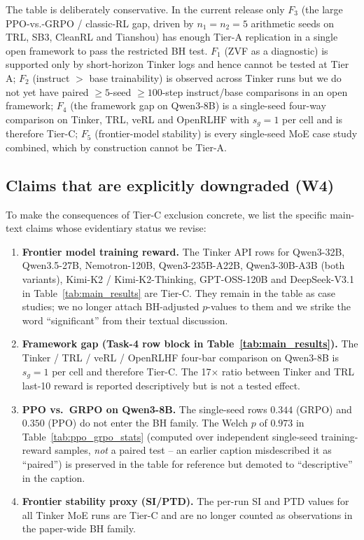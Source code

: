The table is deliberately conservative. In the current release only
$F_3$ (the large PPO-vs.-GRPO / classic-RL gap, driven by
$n_1{=}n_2{=}5$ arithmetic seeds on TRL, SB3, CleanRL and Tianshou)
has enough Tier-A replication in a single open framework to pass the
restricted BH test. $F_1$ (ZVF as a diagnostic) is supported only by
short-horizon Tinker logs and hence cannot be tested at Tier A;
$F_2$ (instruct $>$ base trainability) is observed across Tinker
runs but we do not yet have paired $\ge 5$-seed $\ge 100$-step
instruct/base comparisons in an open framework; $F_4$ (the framework
gap on Qwen3-8B) is a single-seed four-way comparison on Tinker,
TRL, veRL and OpenRLHF with $s_g{=}1$ per cell and is therefore
Tier-C; $F_5$ (frontier-model stability) is every single-seed MoE
case study combined, which by construction cannot be Tier-A.

\subsection{Claims that are explicitly downgraded (W4)}
\label{sec:stat-rigor-addendum:downgrades}

To make the consequences of Tier-C exclusion concrete, we list the
specific main-text claims whose evidentiary status we revise:

\begin{enumerate}
  \item \textbf{Frontier model training reward.} The Tinker API
    rows for Qwen3-32B, Qwen3.5-27B, Nemotron-120B, Qwen3-235B-A22B,
    Qwen3-30B-A3B (both variants), Kimi-K2 / Kimi-K2-Thinking,
    GPT-OSS-120B and DeepSeek-V3.1 in Table~\ref{tab:main_results}
    are Tier-C. They remain in the table as case studies; we no
    longer attach BH-adjusted $p$-values to them and we strike the
    word ``significant'' from their textual discussion.
  \item \textbf{Framework gap (Task-4 row block in
    Table~\ref{tab:main_results}).} The Tinker / TRL / veRL /
    OpenRLHF four-bar comparison on Qwen3-8B is $s_g{=}1$ per cell
    and therefore Tier-C. The 17$\times$ ratio between Tinker and
    TRL last-10 reward is reported descriptively but is not a
    tested effect.
  \item \textbf{PPO vs.\ GRPO on Qwen3-8B.} The single-seed rows
    $0.344$ (GRPO) and $0.350$ (PPO) do not enter the BH family.
    The Welch $p$ of $0.973$ in
    Table~\ref{tab:ppo_grpo_stats} (computed over independent
    single-seed training-reward samples, \emph{not} a paired test --
    an earlier caption misdescribed it as ``paired'')
    is preserved in the table for reference but demoted to
    ``descriptive'' in the caption.
  \item \textbf{Frontier stability proxy (SI/PTD).} The per-run SI
    and PTD values for all Tinker MoE runs are Tier-C and are no
    longer counted as observations in the paper-wide BH family.
\end{enumerate}

